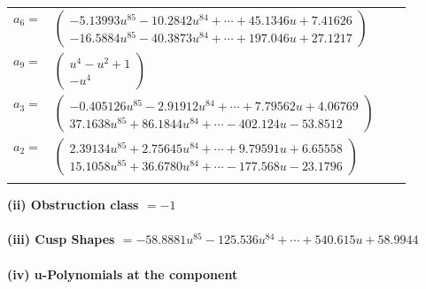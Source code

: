 \documentclass[1p]{elsarticle_modified}
\theoremstyle{definition}
\begin{document}
\begin{tabular}{m{7pt} m{180pt} m{7pt} m{180pt} }
\flushright $a_{6}=$&$\begin{pmatrix}-5.13993 u^{85}-10.2842 u^{84}+\cdots+45.1346 u+7.41626\\-16.5884 u^{85}-40.3873 u^{84}+\cdots+197.046 u+27.1217\end{pmatrix}$ \\
\flushright $a_{9}=$&$\begin{pmatrix}u^4- u^2+1\\- u^4\end{pmatrix}$ \\
\flushright $a_{3}=$&$\begin{pmatrix}-0.405126 u^{85}-2.91912 u^{84}+\cdots+7.79562 u+4.06769\\37.1638 u^{85}+86.1844 u^{84}+\cdots-402.124 u-53.8512\end{pmatrix}$ \\
\flushright $a_{2}=$&$\begin{pmatrix}2.39134 u^{85}+2.75645 u^{84}+\cdots+9.79591 u+6.65558\\15.1058 u^{85}+36.6780 u^{84}+\cdots-177.568 u-23.1796\end{pmatrix}$\\&\end{tabular}
\flushleft \textbf{(ii) Obstruction class $= -1$}\\~\\
\flushleft \textbf{(iii) Cusp Shapes $= -58.8881 u^{85}-125.536 u^{84}+\cdots+540.615 u+58.9944$}\\~\\
\newpage\renewcommand{\arraystretch}{1}
\flushleft \textbf{(iv) u-Polynomials at the component}\newline \\
\end{document}
